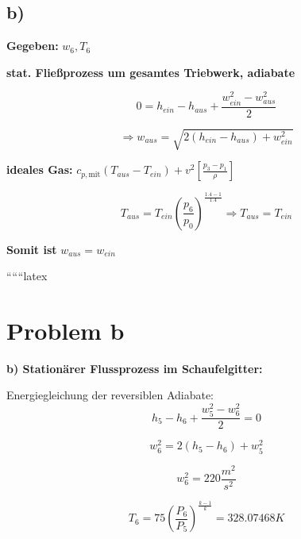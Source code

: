 

\subsection*{b)}

\textbf{Gegeben:} \( w_6, T_6 \)

\textbf{stat. Fließprozess um gesamtes Triebwerk, adiabate}

\[
0 = h_{ein} - h_{aus} + \frac{w_{ein}^2 - w_{aus}^2}{2}
\]

\[
\Rightarrow w_{aus} = \sqrt{2(h_{ein} - h_{aus}) + w_{ein}^2}
\]

\textbf{ideales Gas:} \( c_{p, \text{mit}} (T_{aus} - T_{ein}) + v^2 \left[ \frac{p_3 - p_1}{\rho} \right] \)

\[
T_{aus} = T_{ein} \left( \frac{p_6}{p_0} \right)^{\frac{1.4 - 1}{1.4}} \Rightarrow T_{aus} = T_{ein}
\]

\textbf{Somit ist} \( w_{aus} = w_{ein} \)

``````latex

\section*{Problem b}

\textbf{b) Stationärer Flussprozess im Schaufelgitter:}

Energiegleichung der reversiblen Adiabate:
\[
h_5 - h_6 + \frac{w_5^2 - w_6^2}{2} = 0
\]

\[
w_6^2 = 2(h_5 - h_6) + w_5^2
\]

\[
w_6^2 = 220 \frac{m^2}{s^2}
\]

\[
T_6 = 75 \left( \frac{P_6}{P_5} \right)^{\frac{k-1}{k}} = 328.07468 K
\]